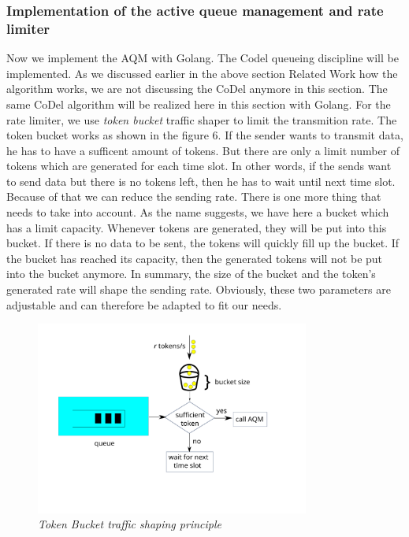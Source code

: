 \subsubsection{Implementation of the active queue management and rate limiter}
Now we implement the AQM with Golang. The Codel queueing discipline will be implemented. As we discussed earlier in the above section Related Work how the algorithm works, we are not discussing the CoDel anymore in this section. The same CoDel algorithm will be realized here in this section with Golang. For the rate limiter, we use \textit{token bucket} traffic shaper to limit the transmition rate. The token bucket works as shown in the figure 6. If the sender wants to transmit data, he has to have a sufficent amount of tokens. But there are only a limit number of tokens which are generated for each time slot. In other words, if the sends want to send data but there is no tokens left, then he has to wait until next time slot. Because of that we can reduce the sending rate. There is one more thing that needs to take into account. As the name suggests, we have here a bucket which has a limit capacity. Whenever tokens are generated, they will be put into this bucket. If there is no data to be sent, the tokens will quickly fill up the bucket. If the bucket has reached its capacity, then the generated tokens will not be put into the bucket anymore. In summary, the size of the bucket and the token's generated rate will shape the sending rate. Obviously, these two parameters are adjustable and can therefore be adapted to fit our needs. 
\begin{figure}[h]
\centering
\includegraphics*[width=9cm]{tokenbucket}
\caption{\em Token Bucket traffic shaping principle}
\label{fig:tcp}
\end{figure}

